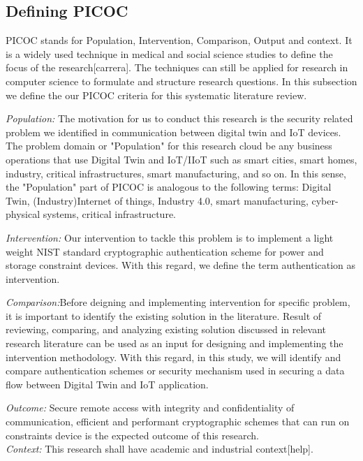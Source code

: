 
\subsection{Defining PICOC}
PICOC stands for Population, Intervention, Comparison, Output and context. It is a widely used technique in medical and social science studies to define the focus of the research[carrera]. The techniques can still be applied for research in computer science to formulate and structure research questions. In this subsection we define the  our PICOC criteria for this systematic literature review.

\textit{Population:} The motivation for us to conduct this research is the security related problem we identified in communication between digital twin and IoT devices. The problem domain or "Population" for this research cloud be any business operations that use Digital Twin and IoT/IIoT such as smart cities, smart homes, industry, critical infrastructures, smart manufacturing, and so on. In this sense, the "Population" part of PICOC is analogous to the following terms: Digital Twin, (Industry)Internet of things, Industry 4.0, smart manufacturing, cyber-physical systems, critical infrastructure. 

\textit{Intervention:} Our intervention to tackle this problem is to implement a light weight NIST standard cryptographic authentication scheme for power and storage constraint devices. With this regard, we define the term authentication as intervention. 

\textit{Comparison:}Before deigning and implementing intervention for specific problem, it is important to identify the existing solution in the literature. Result of reviewing, comparing, and analyzing existing solution discussed in relevant research literature can be used as an input for designing and implementing the intervention methodology. With this regard, in this study, we will identify and compare authentication schemes or security mechanism used in securing a data flow between Digital Twin and IoT application. 

\textit{Outcome:} Secure remote access with integrity and confidentiality of communication, efficient and performant cryptographic schemes that can run on constraints device is the expected outcome of this research.\\

\textit{Context:} This research shall have academic and industrial context[help]. 